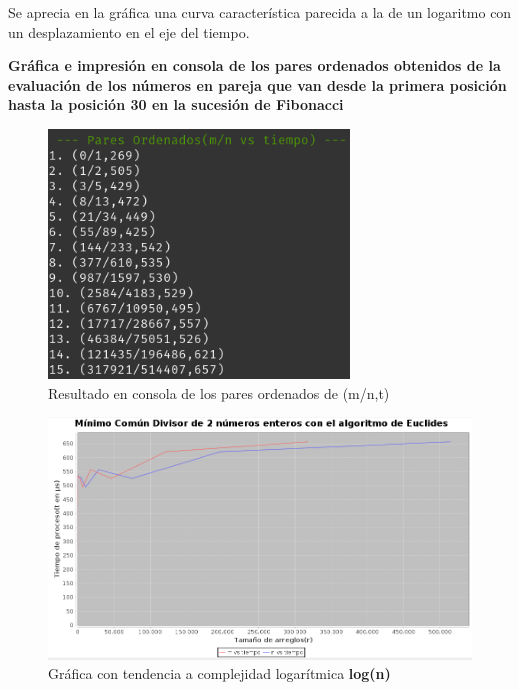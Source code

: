 \documentclass{report}
\begin{document}
\begin{center}
            Se aprecia en la gráfica una curva característica parecida a la de un logaritmo con un desplazamiento en el eje del tiempo.
            
            \hfill \break
            \hfill \break
                
            \textbf{Gráfica e impresión en consola de los pares ordenados obtenidos de la evaluación de los números en pareja que van desde la primera posición hasta la posición 30 en la sucesión de Fibonacci}
                
            \begin{figure}[!h]
            	\centering
            	\includegraphics[width=8cm]{Imagenes/MCD-R-3.png}
                \caption{Resultado en consola de los pares ordenados de (m/n,t)}
            \end{figure}
            
            \begin{figure}[!h]
            	\centering
            	\includegraphics[width=16cm]{Imagenes/MCD-G-3.png}
                \caption{Gráfica con tendencia a complejidad logarítmica \textbf{log(n)}}
            \end{figure}
            

\end{center}
\end{document}
